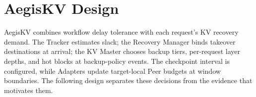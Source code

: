 \section{AegisKV Design}
\label{sec:design}

AegisKV combines workflow delay tolerance with each request's KV
recovery demand. The Tracker estimates slack; the Recovery Manager binds
takeover destinations at arrival; the KV Master chooses backup tiers,
per-request layer depths, and hot blocks at backup-policy events.
The checkpoint interval is configured, while Adapters update target-local
Peer budgets at window boundaries. The following design
separates these decisions from the evidence that motivates them.








